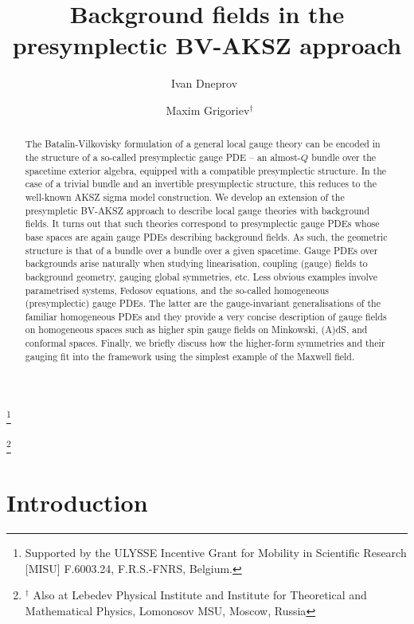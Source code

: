 \documentclass[a4paper,12pt]{article}
\author{Ivan Dneprov~}
\author{~Maxim Grigoriev${}^{\dagger}$}
\affil{\textsl{Service de Physique de l'Univers, Champs et Gravitation, \protect\\ Universit\'e de Mons, 20 place du Parc, 7000 Mons, 
Belgium \vspace{5pt}}}
\date{}
\numberwithin{equation}{section} %
\newcommand\blfootnote[1]{%
  \begingroup
  \renewcommand\thefootnote{}\footnote{#1}%
  \addtocounter{footnote}{-1}%
  \endgroup
}
\begin{document}
\title{Background fields in the presymplectic BV-AKSZ approach}
\maketitle

\begin{abstract}
The Batalin-Vilkovisky formulation of a general local gauge theory can be encoded in the structure of a so-called presymplectic gauge PDE -- an almost-$Q$ bundle over the spacetime exterior algebra, equipped with a compatible presymplectic structure. In the case of a trivial bundle and an invertible presymplectic structure, this reduces to the well-known AKSZ sigma model construction. We develop an extension of the presympletic BV-AKSZ approach to describe local gauge theories with background fields. It turns out that such theories correspond to presymplectic gauge PDEs whose base spaces are again gauge PDEs describing background fields. As such, the geometric structure is that of a bundle over a bundle over a given spacetime. Gauge PDEs over backgrounds arise naturally when studying linearisation, coupling (gauge) fields to background geometry, gauging global symmetries, etc. Less obvious examples involve parametrised systems, Fedosov equations, and the so-called homogeneous (presymplectic) gauge PDEs. The latter are the gauge-invariant generalisations of the familiar homogeneous PDEs and they provide a very concise description of gauge fields on homogeneous spaces such as higher spin gauge fields on Minkowski, (A)dS, and conformal spaces. Finally, we briefly discuss how the higher-form symmetries and their gauging fit into the framework using the simplest example of the Maxwell field.




\end{abstract}

\vfill

\blfootnote{Supported by the ULYSSE Incentive
Grant for Mobility in Scientific Research [MISU] F.6003.24, F.R.S.-FNRS, Belgium.}

\blfootnote{${}^{\dagger}$ Also at Lebedev Physical Institute and Institute for Theoretical and Mathematical Physics, Lomonosov MSU, Moscow, Russia}

\newpage
\tableofcontents

\section{Introduction}
\end{document}
